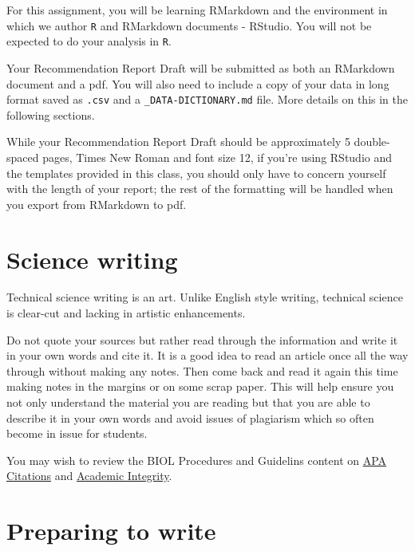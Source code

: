 \documentclass[
]{book}
\begin{document}
For this assignment, you will be learning RMarkdown and the environment in which we author \texttt{R} and RMarkdown documents - RStudio. You will not be expected to do your analysis in \texttt{R}.

Your Recommendation Report Draft will be submitted as both an RMarkdown document and a pdf. You will also need to include a copy of your data in long format saved as \texttt{.csv} and a \texttt{\_DATA-DICTIONARY.md} file. More details on this in the following sections.

While your Recommendation Report Draft should be approximately 5 double-spaced pages, Times New Roman and font size 12, if you're using RStudio and the templates provided in this class, you should only have to concern yourself with the length of your report; the rest of the formatting will be handled when you export from RMarkdown to pdf.

\hypertarget{science-writing}{%
\section*{Science writing}\label{science-writing}}

Technical science writing is an art. Unlike English style writing, technical science is clear-cut and lacking in artistic enhancements.

Do not quote your sources but rather read through the information and write it in your own words and cite it. It is a good idea to read an article once all the way through without making any notes. Then come back and read it again this time making notes in the margins or on some scrap paper. This will help ensure you not only understand the material you are reading but that you are able to describe it in your own words and avoid issues of plagiarism which so often become in issue for students.

You may wish to review the BIOL Procedures and Guidelins content on \href{https://ubco-biology.github.io/Procedures-and-Guidelines/apa-citations.html}{APA Citations} and \href{https://ubco-biology.github.io/Procedures-and-Guidelines/academic-integrity.html}{Academic Integrity}.

\hypertarget{preparing-to-write}{%
\section*{Preparing to write}\label{preparing-to-write}}
\end{document}
